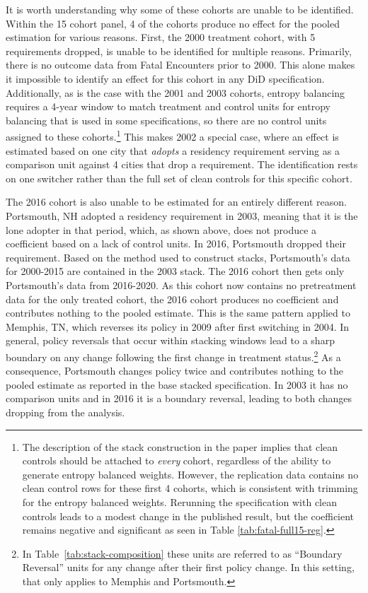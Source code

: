 \documentclass[12pt]{article}
\begin{document}


It is worth understanding why some of these cohorts are unable to be identified. Within the 15 cohort panel, 4 of the cohorts produce no effect for the pooled estimation for various reasons. First, the 2000 treatment cohort, with 5 requirements dropped, is unable to be identified for multiple reasons. Primarily, there is no outcome data from Fatal Encounters prior to 2000. This alone makes it impossible to identify an effect for this cohort in any DiD specification. Additionally, as is the case with the 2001 and 2003 cohorts, entropy balancing requires a 4-year window to match treatment and control units for entropy balancing that is used in some specifications, so there are no control units assigned to these cohorts.\footnote{The description of the stack construction in the paper implies that clean controls should be attached to \textit{every} cohort, regardless of the ability to generate entropy balanced weights. However, the replication data contains no clean control rows for these first 4 cohorts, which is consistent with trimming for the entropy balanced weights. Rerunning the specification with clean controls leads to a modest change in the published result, but the coefficient remains negative and significant as seen in Table \ref{tab:fatal-full15-reg}.} This makes 2002 a special case, where an effect is estimated based on one city that \textit{adopts} a residency requirement serving as a comparison unit against 4 cities that drop a requirement. The identification rests on one switcher rather than the full set of clean controls for this specific cohort.

The 2016 cohort is also unable to be estimated for an entirely different reason. Portsmouth, NH adopted a residency requirement in 2003, meaning that it is the lone adopter in that period, which, as shown above, does not produce a coefficient based on a lack of control units. In 2016, Portsmouth dropped their requirement. Based on the method used to construct stacks, Portsmouth's data for 2000-2015 are contained in the 2003 stack. The 2016 cohort then gets only Portsmouth's data from 2016-2020. As this cohort now contains no pretreatment data for the only treated cohort, the 2016 cohort produces no coefficient and contributes nothing to the pooled estimate. This is the same pattern applied to Memphis, TN, which reverses its policy in 2009 after first switching in 2004. In general, policy reversals that occur within stacking windows lead to a sharp boundary on any change following the first change in treatment status.\footnote{In Table~\ref{tab:stack-composition} these units are referred to as ``Boundary Reversal'' units for any change after their first policy change. In this setting, that only applies to Memphis and Portsmouth.} As a consequence, Portsmouth changes policy twice and contributes nothing to the pooled estimate as reported in the base stacked specification. In 2003 it has no comparison units and in 2016 it is a boundary reversal, leading to both changes dropping from the analysis.
\end{document}
